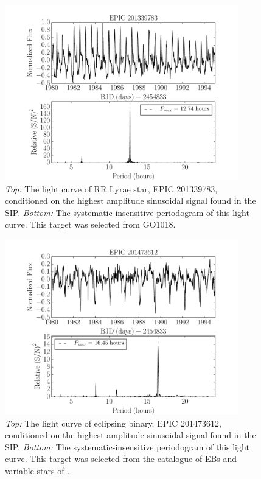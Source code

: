 \documentclass[useAMS, usenatbib]{aastex}
\begin{document}
\begin{figure}
\begin{center}
\includegraphics[width=4in, clip=true]{RR_201339783.pdf}
\caption{{\it Top:} The light curve of RR Lyrae star, EPIC 201339783,
	conditioned on the highest amplitude sinusoidal signal found in the
	SIP. {\it Bottom:} The systematic-insensitive periodogram of
	this light curve. This target was selected from GO1018.}
\label{fig:RRLyrae}
\end{center}
\end{figure}

\begin{figure}
\begin{center}
\includegraphics[width=4in, clip=true]{EB_201473612.pdf}
\caption{{\it Top:} The light curve of eclipsing binary, EPIC 201473612,
	conditioned on the highest amplitude sinusoidal signal found in the
	SIP. {\it Bottom:} The systematic-insensitive periodogram of
	this light curve. This target was selected from the catalogue of EBs
	and variable stars of \citet{Armstrong2015}.}
\label{fig:EB}
\end{center}
\end{figure}
\end{document}
